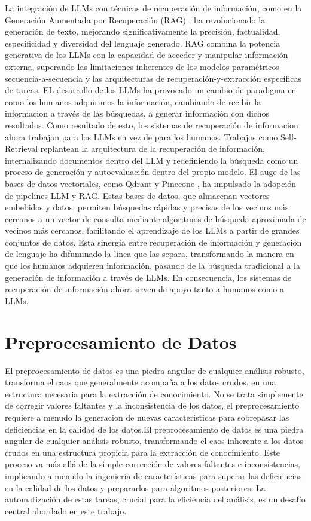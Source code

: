 La integración de LLMs con técnicas de recuperación de información, como en la Generación Aumentada por Recuperación (RAG) \cite{lewis2020retrieval}, ha revolucionado la generación de texto, mejorando significativamente la precisión, factualidad, especificidad y diversidad del lenguaje generado. RAG combina la potencia generativa de los LLMs con la capacidad de acceder y manipular información externa, superando las limitaciones inherentes de los modelos paramétricos secuencia-a-secuencia y las arquitecturas de recuperación-y-extracción específicas de tareas.
EL desarrollo de los LLMs ha provocado un cambio de paradigma en como los humanos adquirimos la información, cambiando de recibir la informacion a través de las búsquedas, a generar información con dichos resultados. Como resultado de esto, los sistemas de recuperación de informacion ahora trabajan para los LLMs en vez de para los humanos. Trabajos como Self-Retrieval \cite{tang2024self} replantean la arquitectura de la recuperación de información, internalizando documentos dentro del LLM y redefiniendo la búsqueda como un proceso de generación y autoevaluación dentro del propio modelo.
El auge de las bases de datos vectoriales, como Qdrant \cite{qdrant} y Pinecone \cite{pinecone}, ha impulsado la adopción de pipelines LLM y RAG. Estas bases de datos, que almacenan vectores embebidos y datos, permiten búsquedas rápidas y precisas de los vecinos más cercanos a un vector de consulta mediante algoritmos de búsqueda aproximada de vecinos más cercanos, facilitando el aprendizaje de los LLMs a partir de grandes conjuntos de datos. Esta sinergia entre recuperación de información y generación de lenguaje ha difuminado la línea que las separa, transformando la manera en que los humanos adquieren información, pasando de la búsqueda tradicional a la generación de información a través de LLMs. En consecuencia, los sistemas de recuperación de información ahora sirven de apoyo tanto a humanos como a LLMs.

\section{Preprocesamiento de Datos}

El preprocesamiento de datos es una piedra angular de cualquier análisis robusto, transforma el caos que generalmente acompaña a los datos crudos, en una estructura necesaria para la extracción de conocimiento. No se trata simplemente de corregir valores faltantes y la inconsistencia de los datos, el preprocesamiento requiere a menudo la generacion de nuevas caracteristicas para sobrepasar las deficiencias en la calidad de los datos.El preprocesamiento de datos es una piedra angular de cualquier análisis robusto, transformando el caos inherente a los datos crudos en una estructura propicia para la extracción de conocimiento. Este proceso va más allá de la simple corrección de valores faltantes e inconsistencias, implicando a menudo la ingeniería de características para superar las deficiencias en la calidad de los datos y prepararlos para algoritmos posteriores. La automatización de estas tareas, crucial para la eficiencia del análisis, es un desafío central abordado en este trabajo.


